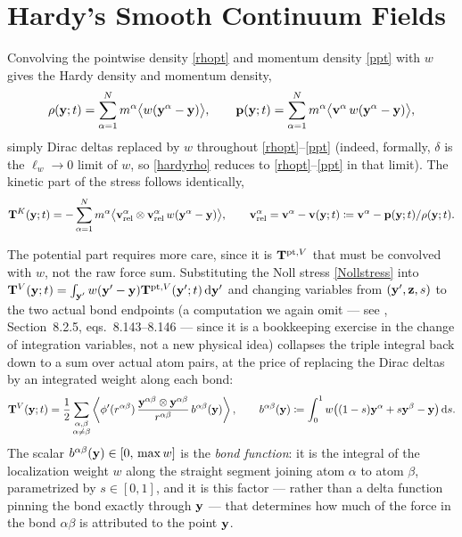 \section{Hardy's Smooth Continuum Fields}

Convolving the pointwise density \eqref{rhopt} and momentum density \eqref{ppt} with $w$ gives the Hardy density and momentum density,
\begin{equation}\label{hardyrho}
	\rho(\mathbf{y};t) = \sum_{\alpha=1}^N m^\alpha\big\langle w(\mathbf{y}^\alpha-\mathbf{y})\big\rangle, \qquad \mathbf{p}(\mathbf{y};t) = \sum_{\alpha=1}^N m^\alpha\big\langle \mathbf{v}^\alpha\,w(\mathbf{y}^\alpha-\mathbf{y})\big\rangle,
\end{equation}
simply Dirac deltas replaced by $w$ throughout \eqref{rhopt}--\eqref{ppt} (indeed, formally, $\delta$ is the $\ell_w\to0$ limit of $w$, so \eqref{hardyrho} reduces to \eqref{rhopt}--\eqref{ppt} in that limit). The kinetic part of the stress follows identically,
\begin{equation}\label{hardyTK}
	\mathbf{T}^K(\mathbf{y};t) = -\sum_{\alpha=1}^N m^\alpha\big\langle \mathbf{v}^\alpha_{\rm rel}\otimes\mathbf{v}^\alpha_{\rm rel}\,w(\mathbf{y}^\alpha-\mathbf{y})\big\rangle, \qquad \mathbf{v}^\alpha_{\rm rel}=\mathbf{v}^\alpha-\mathbf{v}(\mathbf{y};t)\coloneqq\mathbf{v}^\alpha-\mathbf{p}(\mathbf{y};t)/\rho(\mathbf{y};t).
\end{equation}

The potential part requires more care, since it is $\mathbf{T}^{{\rm pt},V}$ that must be convolved with $w$, not the raw force sum. Substituting the Noll stress \eqref{Nollstress} into $\mathbf{T}^V(\mathbf{y};t)=\int_{\mathbf{y}'} w(\mathbf{y}'-\mathbf{y})\mathbf{T}^{{\rm pt},V}(\mathbf{y}';t)\,\mathrm{d}\mathbf{y}'$ and changing variables from $(\mathbf{y}',\mathbf{z},s)$ to the two actual bond endpoints (a computation we again omit --- see \cite{TadmorMiller}, Section~8.2.5, eqs.~8.143--8.146 --- since it is a bookkeeping exercise in the change of integration variables, not a new physical idea) collapses the triple integral back down to a sum over actual atom pairs, at the price of replacing the Dirac deltas by an integrated weight along each bond:
\begin{equation}\label{hardyTV}
	\mathbf{T}^V(\mathbf{y};t) = \frac12\sum_{\substack{\alpha,\beta\\\alpha\neq\beta}}\left\langle \phi'(r^{\alpha\beta})\,\frac{\mathbf{y}^{\alpha\beta}\otimes\mathbf{y}^{\alpha\beta}}{r^{\alpha\beta}}\,b^{\alpha\beta}(\mathbf{y})\right\rangle, \qquad b^{\alpha\beta}(\mathbf{y}) \coloneqq \int_0^1 w\big((1-s)\mathbf{y}^\alpha+s\mathbf{y}^\beta - \mathbf{y}\big)\,\mathrm{d} s.
\end{equation}
The scalar $b^{\alpha\beta}(\mathbf{y})\in[0,\,\max w]$ is the \textit{bond function}: it is the integral of the localization weight $w$ along the straight segment joining atom $\alpha$ to atom $\beta$, parametrized by $s\in[0,1]$, and it is this factor --- rather than a delta function pinning the bond exactly through $\mathbf{y}$ --- that determines how much of the force in the bond $\alpha\beta$ is attributed to the point $\mathbf{y}$.


